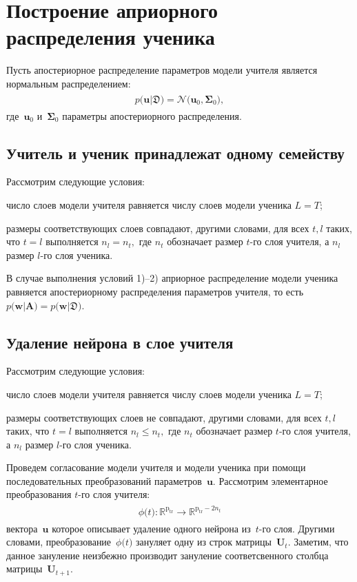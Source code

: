 \documentclass[12pt]{a&t}
\begin{document}
\section{Построение априорного распределения ученика}
Пусть апостериорное распределение параметров модели учителя является нормальным распределением:
\begin{gather}
\label{eq:ap:1}
\begin{aligned}
p\bigr(\mathbf{u}|\mathfrak{D}\bigr) = \mathcal{N}\bigr(\mathbf{u}_0, \bm{\Sigma}_0\bigr),
\end{aligned}
\end{gather}
где~$\mathbf{u}_0$ и~$\bm{\Sigma}_0$ параметры апостериорного распределения.

\subsection{Учитель и ученик принадлежат одному семейству}
Рассмотрим следующие условия:
\begin{enumlist}
    \item число слоев модели учителя равняется числу слоев модели ученика $L=T$;
    \item размеры соответствующих слоев совпадают, другими словами, для всех $t, l$ таких, что $t=l$ выполняется $n_l = n_t,$ где $n_t$ обозначает размер $t$-го слоя учителя, а $n_l$ размер $l$-го слоя ученика.
\end{enumlist}
В случае выполнения условий 1)--2) априорное распределение модели ученика равняется апостериорному распределения параметров учителя, то есть $p\bigr(\mathbf{w}|\mathbf{A}\bigr) = p\bigr(\mathbf{w}|\mathfrak{D}\bigr)$.

\subsection{Удаление нейрона в слое учителя}
Рассмотрим следующие условия:
\begin{enumlist}
    \item число слоев модели учителя равняется числу слоев модели ученика $L=T$;
    \item размеры соответствующих слоев не совпадают, другими словами, для всех $t, l$ таких, что $t=l$ выполняется $n_l \leq n_t,$ где $n_t$ обозначает размер $t$-го слоя учителя, а $n_l$ размер $l$-го слоя ученика.
\end{enumlist}
Проведем согласование модели учителя и модели ученика при помощи последовательных преобразований параметров~$\mathbf{u}$. Рассмотрим элементарное преобразования $t$-го слоя учителя:
\begin{gather}
\label{eq:ap:2}
\begin{aligned}
\phi\bigr(t\bigr) : \mathbb{R}^{\text{p}_{\text{tr}}} \to \mathbb{R}^{\text{p}_{\text{tr}}-2n_t}
\end{aligned}
\end{gather}
вектора~$\mathbf{u}$ которое описывает удаление одного нейрона из~$t$-го слоя. Другими словами, преобразование~$\phi\bigr(t\bigr)$ зануляет одну из строк матрицы~$\mathbf{U}_t$. Заметим, что данное зануление неизбежно производит зануление соответсвенного столбца матрицы~$\mathbf{U}_{t+1}$.
\end{document}
